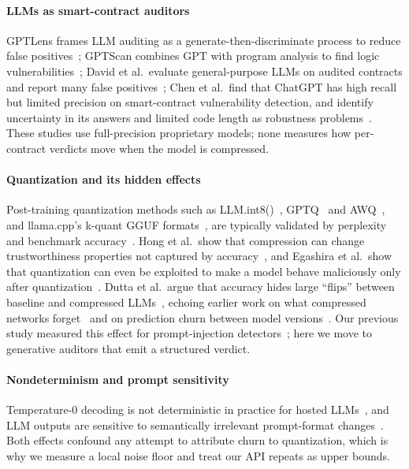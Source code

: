 \paragraph{LLMs as smart-contract auditors}
GPTLens frames LLM auditing as a generate-then-discriminate process to reduce false positives~\cite{hu2023gptlens}; GPTScan combines GPT with program analysis to find logic vulnerabilities~\cite{sun2024gptscan}; David et al.\ evaluate general-purpose LLMs on audited contracts and report many false positives~\cite{david2023manual}; Chen et al.\ find that ChatGPT has high recall but limited precision on smart-contract vulnerability detection, and identify uncertainty in its answers and limited code length as robustness problems~\cite{chen2025chatgpt}. These studies use full-precision proprietary models; none measures how per-contract verdicts move when the model is compressed.

\paragraph{Quantization and its hidden effects}
Post-training quantization methods such as LLM.int8()~\cite{dettmers2022llmint8}, GPTQ~\cite{frantar2023gptq} and AWQ~\cite{lin2024awq}, and llama.cpp's k-quant GGUF formats~\cite{llamacpp}, are typically validated by perplexity and benchmark accuracy~\cite{li2024evaluating,jin2024comprehensive}. Hong et al.\ show that compression can change trustworthiness properties not captured by accuracy~\cite{hong2024decoding}, and Egashira et al.\ show that quantization can even be exploited to make a model behave maliciously only after quantization~\cite{egashira2024exploiting}. Dutta et al.\ argue that accuracy hides large ``flips'' between baseline and compressed LLMs~\cite{dutta2024accuracy}, echoing earlier work on what compressed networks forget~\cite{hooker2019forget} and on prediction churn between model versions~\cite{milanifard2016churn}. Our previous study measured this effect for prompt-injection detectors~\cite{anjum2026guardians}; here we move to generative auditors that emit a structured verdict.

\paragraph{Nondeterminism and prompt sensitivity}
Temperature-0 decoding is not deterministic in practice for hosted LLMs~\cite{ouyang2023nondeterminism,atil2024nondeterminism}, and LLM outputs are sensitive to semantically irrelevant prompt-format changes~\cite{sclar2024quantifying}. Both effects confound any attempt to attribute churn to quantization, which is why we measure a local noise floor and treat our API repeats as upper bounds.

